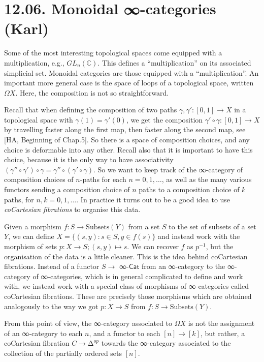\documentclass[a4paper]{amsart}
\numberwithin{figure}{section}
\theoremstyle{theorem}
\theoremstyle{definition}
\newcommand{\CC}{\mathbb{C}}
\begin{document}
\section{12.06. Monoidal ∞-categories (Karl)} %

Some of the most interesting topological spaces come equipped with a multiplication, e.g., $GL_n(\CC)$. This defines a ``multiplication'' on its associated simplicial set. Monoidal categories are those equipped with a ``multiplication''. An important more general case is the space of loops of a topological space, written $\Omega X$. Here, the composition is not so straightforward.

Recall that when defining the composition of two paths $\gamma, \gamma': [0, 1] \to X$ in a topological space with $\gamma(1) = \gamma'(0)$, we get the composition $\gamma'\circ \gamma: [0,1] \to X$ by travelling faster along the first map, then faster along the second map, see [HA, Beginning of Chap.5]. So there is a space of composition choices, and any choice is deformable into any other. Recall also that it is important to have this choice, because it is the only way to have associativity $(\gamma'' \circ \gamma') \circ \gamma = \gamma'' \circ (\gamma' \circ \gamma)$. So we want to keep track of the ∞-category of composition choices of $n$-paths for each $n = 0, 1, \dots$, as well as the many various functors sending a composition choice of $n$ paths to a composition choice of $k$ paths, for $n, k = 0, 1, \dots$. In practice it turns out to be a good idea to use \emph{coCartesian fibrations} to organise this data.

Given a morphism $f: S \to \mathrm{Subsets}(Y)$ from a set $S$ to the set of subsets of a set $Y$, we can define $X = \{(s, y) : s \in S, y \in f(s)\}$ and instead work with the morphism of sets $p: X \to S; (s, y) \mapsto s$. We can recover $f$ as $p^{-1}$, but the organisation of the data is a little cleaner. This is the idea behind coCartesian fibrations. Instead of a functor $S \to $ ∞-$\mathsf{Cat}$ from an ∞-category to the ∞-category of ∞-categories, which is in general complicated to define and work with, we instead work with a special class of morphisms of ∞-categories called coCartesian fibrations. These are precisely those morphisms which are obtained analogously to the way we got $p: X → S$ from $f: S → \mathrm{Subsets}(Y)$.

From this point of view, the ∞-category associated to $\Omega X$ is not the assignment of an ∞-category to each $n$, and a functor to each $[n] → [k]$, but rather, a coCartesian fibration $C → ∆^{op}$ towards the ∞-category associated to the collection of the partially ordered sets $[n]$.
\end{document}
